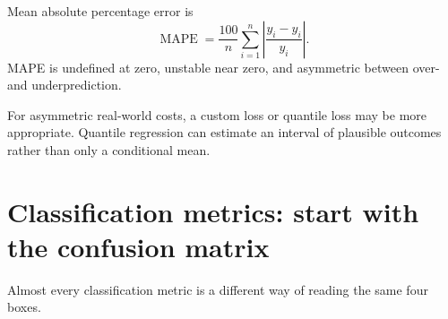 Mean absolute percentage error is
\[
  \operatorname{MAPE}
  =\frac{100}{n}\sum_{i=1}^{n}
  \left|\frac{y_i-\hat{y}_i}{y_i}\right|.
\]
MAPE is undefined at zero, unstable near zero, and asymmetric between over- and underprediction.

For asymmetric real-world costs, a custom loss or quantile loss may be more appropriate. Quantile regression can estimate an interval of plausible outcomes rather than only a conditional mean.

\section{Classification metrics: start with the confusion matrix}
\label{sec:classification-metrics}

Almost every classification metric is a different way of reading the same four boxes.

